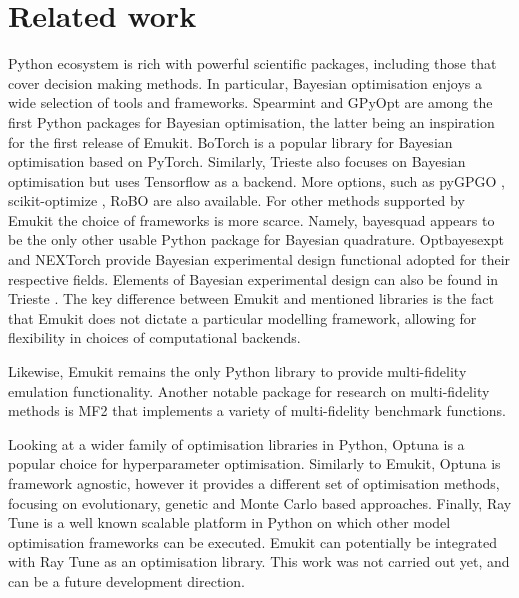 \section{Related work}
Python ecosystem is rich with powerful scientific packages, including those that cover decision making methods. In particular, Bayesian optimisation enjoys a wide selection of tools and frameworks. Spearmint \cite{snoek2012practical} and GPyOpt \cite{gpyopt2016} are among the first Python packages for Bayesian optimisation, the latter being an inspiration for the first release of Emukit. BoTorch \cite{balandat2020botorch} is a popular library for Bayesian optimisation based on PyTorch. Similarly, Trieste \cite{picheny2023trieste} also focuses on Bayesian optimisation but uses Tensorflow as a backend. More options, such as pyGPGO \cite{jimenez2017pygpgo}, scikit-optimize \cite{louppe2017bayesian}, RoBO \cite{klein-bayesopt17} are also available. For other methods supported by Emukit the choice of frameworks is more scarce. Namely, bayesquad \cite{Charles2013} appears to be the only other usable Python package for Bayesian quadrature. Optbayesexpt \cite{mcmichael2021optbayesexpt} and NEXTorch \cite{wang2021nextorch} provide Bayesian experimental design functional adopted for their respective fields. Elements of Bayesian experimental design can also be found in Trieste \cite{picheny2023trieste}. The key difference between Emukit and mentioned libraries is the fact that Emukit does not dictate a particular modelling framework, allowing for flexibility in choices of computational backends.

Likewise, Emukit remains the only Python library to provide multi-fidelity emulation functionality. Another notable package for research on multi-fidelity methods is MF2 \cite{vanRijn2020} that implements a variety of multi-fidelity benchmark functions.

Looking at a wider family of optimisation libraries in Python, Optuna \cite{optuna_2019} is a popular choice for hyperparameter optimisation. Similarly to Emukit, Optuna is framework agnostic, however it provides a different set of optimisation methods, focusing on evolutionary, genetic and Monte Carlo based approaches. Finally, Ray Tune \cite{liaw2018tune} is a well known scalable platform in Python on which other model optimisation frameworks can be executed. Emukit can potentially be integrated with Ray Tune as an optimisation library. This work was not carried out yet, and can be a future development direction.



